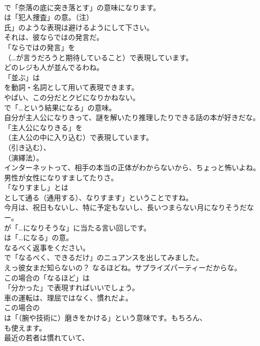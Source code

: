 \documentclass[8pt]{extreport}
\begin{document}
\begin{CJK}{UTF8}{min}
\\	で「奈落の底に突き落とす」の意味になります。
\\	は「犯人捜査」の意。（注）
\\	氏」のような表現は避けるようにして下さい。	
\\	それは、彼ならではの発言だ。 
\\	「ならではの発言」を
\\	（…が言うだろうと期待していること）で表現しています。	
\\	どのレジも人が並んでるわね。 
\\	「並ぶ」は
\\	を動詞・名詞として用いて表現できます。	
\\	やばい、この分だとクビになりかねない。 
\\	で「…という結果になる」の意味。	
\\	自分が主人公になりきって、謎を解いたり推理したりできる話の本が好きだな。 
\\	「主人公になりきる」を
\\	（主人公の中に入り込む）で表現しています。
\\	（引き込む）、
\\	（演繹法）。	
\\	インターネットって、相手の本当の正体がわからないから、ちょっと怖いよね。男性が女性になりすましてたりさ。 
\\	「なりすまし」とは
\\	として通る（通用する）、なりすます」ということですね。	
\\	今月は、祝日もないし、特に予定もないし、長いつまらない月になりそうだなー。 
\\	が「…になりそうな」に当たる言い回しです。
\\	は「…になる」の意。	
\\	なるべく返事をください。 
\\	で「なるべく、できるだけ」のニュアンスを出してみました。	
\\	えっ彼女まだ知らないの？ なるほどね。サプライズパーティーだからな。 
\\	この場合の「なるほど」は
\\	「分かった」で表現すればいいでしょう。	
\\	車の運転は、理屈ではなく、慣れだよ。 
\\	この場合の
\\	は「（腕や技術に）磨きをかける」という意味です。もちろん、
\\	も使えます。	
\\	最近の若者は慣れていて、

\end{CJK}
\end{document}
